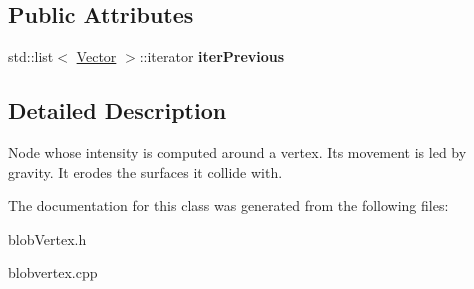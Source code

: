 \subsection*{Public Attributes}
\begin{DoxyCompactItemize}
\item 
\hypertarget{class_blob_move_aecf8ca0a32595f9d0619e89aef16d42d}{
std::list$<$ \hyperlink{class_vector}{Vector} $>$::iterator {\bfseries iterPrevious}}
\label{class_blob_move_aecf8ca0a32595f9d0619e89aef16d42d}

\end{DoxyCompactItemize}


\subsection{Detailed Description}
Node whose intensity is computed around a vertex. Its movement is led by gravity. It erodes the surfaces it collide with. 

The documentation for this class was generated from the following files:\begin{DoxyCompactItemize}
\item 
blobVertex.h\item 
blobvertex.cpp\end{DoxyCompactItemize}

